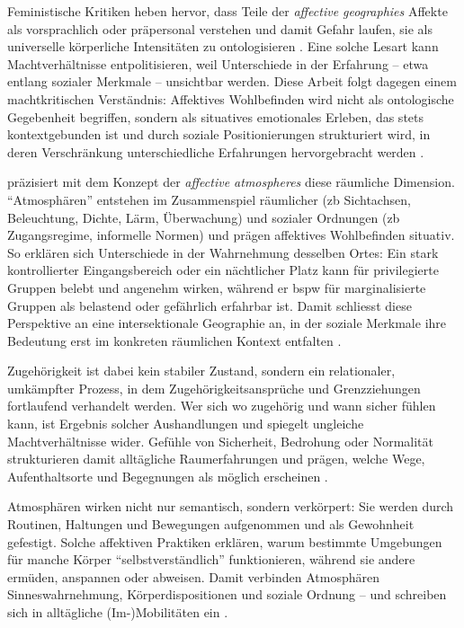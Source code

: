 Feministische Kritiken heben hervor, dass Teile der \emph{affective geographies} Affekte als vorsprachlich oder präpersonal verstehen und damit Gefahr laufen, sie als universelle körperliche Intensitäten zu ontologisieren \parencite{hemmingsInvokingAffectCultural2005,andersonAffectiveAtmospheres2009}. Eine solche Lesart kann Machtverhältnisse entpolitisieren, weil Unterschiede in der Erfahrung -- etwa entlang sozialer Merkmale -- unsichtbar werden. Diese Arbeit folgt dagegen einem machtkritischen Verständnis: Affektives Wohlbefinden wird nicht als ontologische Gegebenheit begriffen, sondern als situatives emotionales Erleben, das stets kontextgebunden ist und durch soziale Positionierungen strukturiert wird, in deren Verschränkung unterschiedliche Erfahrungen hervorgebracht werden \parencite{ahmedAffectiveEconomies2004,rodo-de-zarateIntersectionalitySpatialityEmotions2023}.

\textcite{andersonAffectiveAtmospheres2009} präzisiert mit dem Konzept der \emph{affective atmospheres} diese räumliche Dimension. \enquote{Atmosphären} entstehen im Zusammenspiel räumlicher (\gls{zb} Sichtachsen, Beleuchtung, Dichte, Lärm, Überwachung) und sozialer Ordnungen (\gls{zb} Zugangsregime, informelle Normen) und prägen affektives Wohlbefinden situativ. So erklären sich Unterschiede in der Wahrnehmung desselben Ortes: Ein stark kontrollierter Eingangsbereich oder ein nächtlicher Platz kann für privilegierte Gruppen belebt und angenehm wirken, während er \gls{bspw} für marginalisierte Gruppen als belastend oder gefährlich erfahrbar ist. Damit schliesst diese Perspektive an eine intersektionale Geographie an, in der soziale Merkmale ihre Bedeutung erst im konkreten räumlichen Kontext entfalten \parencite{valentineTheorizingResearchingIntersectionality2007,rodo-de-zarateIntersectionalityFeministGeographies2018}.

Zugehörigkeit ist dabei kein stabiler Zustand, sondern ein relationaler, umkämpfter Prozess, in dem Zugehörigkeitsansprüche und Grenzziehungen fortlaufend verhandelt werden. Wer sich wo zugehörig und wann sicher fühlen kann, ist Ergebnis solcher Aushandlungen und spiegelt ungleiche Machtverhältnisse wider. Gefühle von Sicherheit, Bedrohung oder Normalität strukturieren damit alltägliche Raumerfahrungen und prägen, welche Wege, Aufenthaltsorte und Begegnungen als möglich erscheinen \parencite{antonsichSearchingBelongingAnalytical2010,painGlobalizedFearEmotional2009}.

Atmosphären wirken nicht nur semantisch, sondern verkörpert: Sie werden durch Routinen, Haltungen und Bewegungen aufgenommen und als Gewohnheit gefestigt. Solche affektiven Praktiken erklären, warum bestimmte Umgebungen für manche Körper \enquote{selbstverständlich} funktionieren, während sie andere ermüden, anspannen oder abweisen. Damit verbinden Atmosphären Sinneswahrnehmung, Körperdispositionen und soziale Ordnung -- und schreiben sich in alltägliche (Im-)Mobilitäten ein \parencite{mccormackEngineeringAffectiveAtmospheres2008,bissellPassengerMobilitiesAffective2010}.

